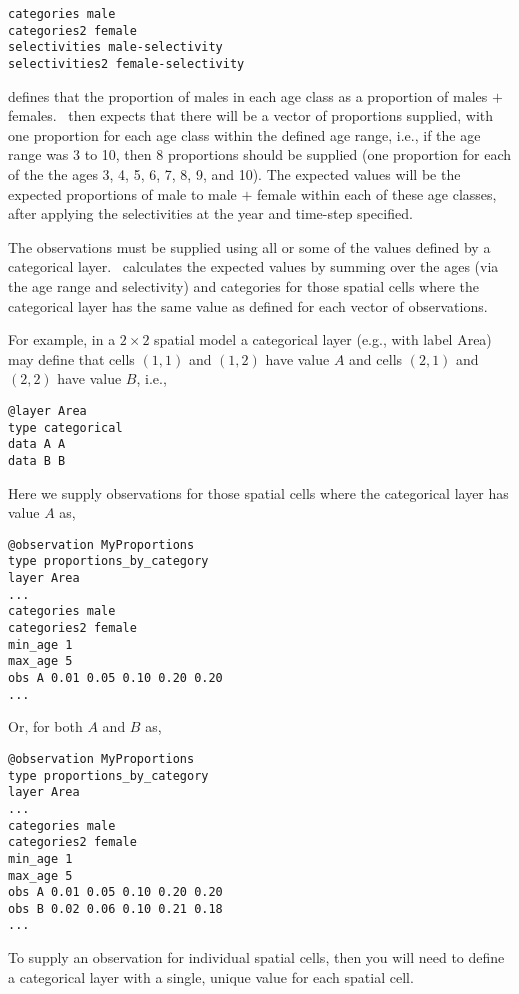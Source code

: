 {{{{{{{\small{\begin{verbatim}
categories male
categories2 female
selectivities male-selectivity
selectivities2 female-selectivity
\end{verbatim}}}

defines that the proportion of males in each age class as a proportion of males $+$ females. \SPM\ then expects that there will be a vector of proportions supplied, with one proportion for each age class within the defined age range, i.e., if the age range was 3 to 10, then 8 proportions should be supplied (one proportion for each of the the ages 3, 4, 5, 6, 7, 8, 9, and 10). The expected values will be the expected proportions of male to male $+$ female within each of these age classes, after applying the selectivities at the year and time-step specified. 

The observations must be supplied using all or some of the values defined by a categorical layer. \SPM\ calculates the expected values by summing over the ages (via the age range and selectivity) and categories for those spatial cells where the categorical layer has the same value as defined for each vector of observations.

For example, in a $2 \times 2$ spatial model a categorical layer (e.g., with label Area) may define that cells $(1,1)$ and $(1,2)$ have value $A$ and cells $(2,1)$ and $(2,2)$ have value $B$, i.e.,

{\small{\begin{verbatim}
@layer Area
type categorical
data A A 
data B B
\end{verbatim}}}

Here we supply observations for those spatial cells where the categorical layer has value $A$ as, 

{\small{\begin{verbatim}
@observation MyProportions
type proportions_by_category
layer Area
...
categories male 
categories2 female
min_age 1
max_age 5
obs A 0.01 0.05 0.10 0.20 0.20
...
\end{verbatim}}}

Or, for both $A$ and $B$ as,

{\small{\begin{verbatim}
@observation MyProportions
type proportions_by_category
layer Area
...
categories male
categories2 female
min_age 1
max_age 5
obs A 0.01 0.05 0.10 0.20 0.20
obs B 0.02 0.06 0.10 0.21 0.18
...
\end{verbatim}}}

To supply an observation for individual spatial cells, then you will need to define a categorical layer with a single, unique value for each spatial cell. 

}}}}}}
